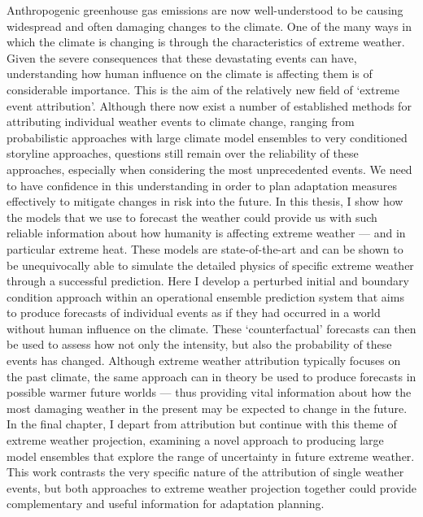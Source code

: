 Anthropogenic greenhouse gas emissions are now well-understood to be causing widespread and often damaging changes to the climate. One of the many ways in which the climate is changing is through the characteristics of extreme weather. Given the severe consequences that these devastating events can have, understanding how human influence on the climate is affecting them is of considerable importance. This is the aim of the relatively new field of `extreme event attribution'. Although there now exist a number of established methods for attributing individual weather events to climate change, ranging from probabilistic approaches with large climate model ensembles to very conditioned storyline approaches, questions still remain over the reliability of these approaches, especially when considering the most unprecedented events. We need to have confidence in this understanding in order to plan adaptation measures effectively to mitigate changes in risk into the future. In this thesis, I show how the models that we use to forecast the weather could provide us with such reliable information about how humanity is affecting extreme weather --- and in particular extreme heat. These models are state-of-the-art and can be shown to be unequivocally able to simulate the detailed physics of specific extreme weather through a successful prediction. Here I develop a perturbed initial and boundary condition approach within an operational ensemble prediction system that aims to produce forecasts of individual events as if they had occurred in a world without human influence on the climate. These `counterfactual' forecasts can then be used to assess how not only the intensity, but also the probability of these events has changed. Although extreme weather attribution typically focuses on the past climate, the same approach can in theory be used to produce forecasts in possible warmer future worlds --- thus providing vital information about how the most damaging weather in the present may be expected to change in the future. In the final chapter, I depart from attribution but continue with this theme of extreme weather projection, examining a novel approach to producing large model ensembles that explore the range of uncertainty in future extreme weather. This work contrasts the very specific nature of the attribution of single weather events, but both approaches to extreme weather projection together could provide complementary and useful information for adaptation planning. 